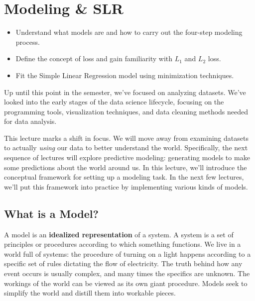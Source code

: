 \documentclass[
  letterpaper,
  DIV=11,
  numbers=noendperiod]{scrreprt}
\providecommand{\tightlist}{%
  \setlength{\itemsep}{0pt}\setlength{\parskip}{0pt}}\usepackage{longtable,booktabs,array}
\begin{document}

\chapter{Modeling \& SLR}\label{modeling-slr}

\begin{tcolorbox}[enhanced jigsaw, titlerule=0mm, bottomtitle=1mm, arc=.35mm, colframe=quarto-callout-note-color-frame, rightrule=.15mm, opacityback=0, opacitybacktitle=0.6, leftrule=.75mm, breakable, toprule=.15mm, colback=white, left=2mm, colbacktitle=quarto-callout-note-color!10!white, toptitle=1mm, bottomrule=.15mm, title=\textcolor{quarto-callout-note-color}{\faInfo}\hspace{0.5em}{Learning Outcomes}, coltitle=black]

\begin{itemize}
\tightlist
\item
  Understand what models are and how to carry out the four-step modeling
  process.
\item
  Define the concept of loss and gain familiarity with \(L_1\) and
  \(L_2\) loss.
\item
  Fit the Simple Linear Regression model using minimization techniques.
\end{itemize}

\end{tcolorbox}

Up until this point in the semester, we've focused on analyzing
datasets. We've looked into the early stages of the data science
lifecycle, focusing on the programming tools, visualization techniques,
and data cleaning methods needed for data analysis.

This lecture marks a shift in focus. We will move away from examining
datasets to actually \emph{using} our data to better understand the
world. Specifically, the next sequence of lectures will explore
predictive modeling: generating models to make some predictions about
the world around us. In this lecture, we'll introduce the conceptual
framework for setting up a modeling task. In the next few lectures,
we'll put this framework into practice by implementing various kinds of
models.

\section{What is a Model?}\label{what-is-a-model}

A model is an \textbf{idealized representation} of a system. A system is
a set of principles or procedures according to which something
functions. We live in a world full of systems: the procedure of turning
on a light happens according to a specific set of rules dictating the
flow of electricity. The truth behind how any event occurs is usually
complex, and many times the specifics are unknown. The workings of the
world can be viewed as its own giant procedure. Models seek to simplify
the world and distill them into workable pieces.
\end{document}
